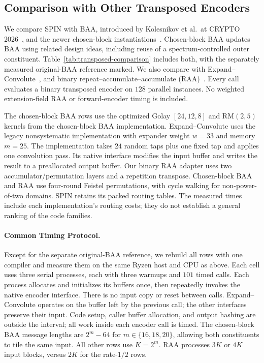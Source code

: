 \subsection{Comparison with Other Transposed Encoders}
\label{app:transposed-comparison-details}

We compare SPIN with BAA, introduced by Kolesnikov et al.\ at CRYPTO
2026~\cite{KolesnikovEtAl2026BA}, and the newer chosen-block
instantiations~\cite{cryptoeprint:2026/1903}. Chosen-block BAA updates
BAA using related design ideas, including reuse of
a spectrum-controlled outer constituent. Table~\ref{tab:transposed-comparison}
includes both, with the separately measured original-BAA reference marked.
We also compare with
Expand--Convolute~\cite{RaghuramanRindalTanguy2023EC}, and binary
repeat--accumulate--accumulate (RAA)~\cite{blaze25}. Every call evaluates a binary
transposed encoder on $128$ parallel instances. No weighted extension-field
RAA or forward-encoder timing is included.

The chosen-block BAA rows use the optimized Golay $[24,12,8]$ and RM$(2,5)$ kernels
from the chosen-block BAA implementation. Expand--Convolute uses the legacy
nonsystematic implementation with expander weight $w=33$ and memory $m=25$.
The implementation takes $24$ random taps plus one fixed tap and applies
one convolution pass. Its native interface modifies the input buffer and
writes the result to a preallocated output buffer. Our binary RAA adapter
uses two accumulator/permutation layers and a repetition transpose.
Chosen-block BAA and RAA use four-round Feistel permutations, with cycle walking for
non-power-of-two domains. SPIN retains its packed routing tables.
The measured times include each implementation's routing costs; they do
not establish a general ranking of the code families.

\paragraph{Common Timing Protocol.}
Except for the separate original-BAA reference, we rebuild all rows with
one compiler and measure them on the same Ryzen
host and CPU as above. Each cell uses three serial processes, each with
three warmups and $101$ timed calls. Each process allocates and initializes
its buffers once, then repeatedly invokes the native encoder interface.
There is no input copy or reset between calls. Expand--Convolute operates
on the buffer left by the previous call; the other interfaces preserve
their input. Code setup, caller buffer allocation, and output hashing
are outside the interval; all work inside each encoder call is timed.
The chosen-block BAA message lengths are $2^m-64$ for $m\in\{16,18,20\}$, allowing
both constituents to tile the same input. All other rows use $K=2^m$.
RAA processes $3K$ or $4K$ input blocks, versus $2K$ for the rate-$1/2$ rows.

